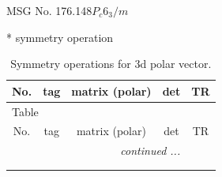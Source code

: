 \documentclass[fleqn,8pt]{jsarticle}
\begin{document}
\setcounter{MaxMatrixCols}{32}

\renewcommand{\tablename}{Table~}
\renewcommand{\figurename}{Figure~}
\begin{center}
\LARGE
MSG No. 176.148\quad$P_{c}6_{3}/m$
\end{center}
* symmetry operation
\renewcommand{\arraystretch}{1.3}
\begin{longtable}{ccccc}
\caption{Symmetry operations for 3d polar vector.}
 \\
 \hline \hline
No. & tag & matrix (polar) & det & TR \\ \hline \endfirsthead

\multicolumn{4}{l}{\tablename\ \thetable{}} \\
 \hline \hline
No. & tag & matrix (polar) & det & TR \\ \hline \endhead

 \hline \hline
\multicolumn{4}{r}{\footnotesize\it continued ...} \\ \endfoot

 \hline \hline
\multicolumn{4}{r}{} \\ \endlastfoot


\end{longtable}
\end{document}
